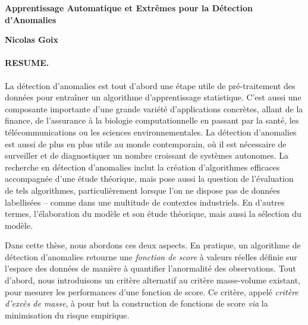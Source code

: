 \documentclass[a4paper, 8pt]{article}
\begin{document}
\begin{center}
{\large \textbf{Apprentissage Automatique et Extrêmes pour la Détection d'Anomalies\\}}
\vspace{0.5em}

\textbf{Nicolas Goix}
\end{center}



\paragraph{RESUME.}

La détection d'anomalies est tout d'abord une étape utile de pré-traitement des données pour entraîner un algorithme d'apprentissage statistique. C'est aussi une composante importante d'une grande variété d'applications concrètes, allant de la finance, de l'assurance à la biologie computationnelle en passant par la santé, les télécommunications ou les sciences environnementales. La détection d'anomalies est aussi de plus en plus utile au monde contemporain, où il est nécessaire de surveiller et de diagnostiquer un nombre croissant de systèmes autonomes. La recherche en détection d'anomalies inclut la création d'algorithmes efficaces accompagnée d'une étude théorique, mais pose aussi la question de l'évaluation de tels algorithmes, particulièrement lorsque l'on ne dispose pas de données labellisées -- comme dans une multitude de contextes industriels.
%
En d'autres termes, l'élaboration du modèle et son étude théorique, mais aussi la sélection du modèle.
%

Dans cette thèse, nous abordons ces deux aspects. En pratique, un algorithme de détection d'anomalies retourne une \emph{fonction de score} à valeurs réelles définie sur l'espace des données de manière à quantifier l'anormalité des observations.
%
Tout d'abord, nous introduisons un critère alternatif au critère masse-volume existant, pour mesurer les performances d'une fonction de score.
%
Ce critère, appelé \emph{critère d'excès de masse}, à pour but la construction de fonctions de score \emph{via} la minimisation du risque empirique.
\end{document}
